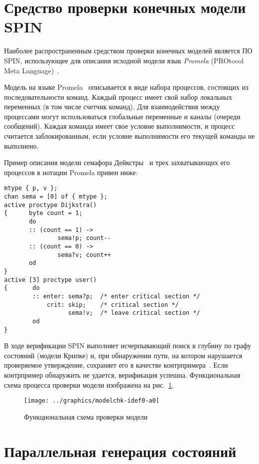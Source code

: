\documentclass[12pt,a4paper,fleqn]{article}
\begin{document}
\section{Средство проверки конечных модели SPIN}
\label{sec:spin}

Наиболее распространенным средством проверки конечных моделей является ПО SPIN, использующее для описания исходной
модели язык \emph{Promela} (PROtocol Meta Language)~\cite{SpinRoot}.

Модель на языке Promela~ описывается в виде набора процессов, состоящих из последовательности команд. Каждый процесс
имеет свой набор локальных переменных (в том числе счетчик команд). Для взаимодействия между процессами могут
использоваться глобальные переменные и каналы (очереди сообщений). Каждая команда имеет свое условие выполнимости, и
процесс считается заблокированным, если условие выполнимости его текущей команды не выполнено.

Пример описания модели семафора Дейкстры~\cite{SPIN} и трех захватывающих его процессов в нотации Promela привен ниже:

\begin{lstlisting}[language=Promela]
mtype { p, v };
chan sema = [0] of { mtype };
active proctype Dijkstra()
{      byte count = 1;
       do
       :: (count == 1) ->
               sema!p; count--
       :: (count == 0) ->
               sema?v; count++
       od
}
active [3] proctype user()
{       do
        :: enter: sema?p;  /* enter critical section */
            crit: skip;    /* critical section */
                  sema!v;  /* leave critical section */
        od
}  
\end{lstlisting}

В ходе верификации SPIN выполняет исчерпывающий поиск в глубину по графу состояний (модели Крипке) и, при обнаружении
пути, на котором нарушается проверяемое утверждение, сохраняет его в качестве контрпримера~\cite{Clarke}. Если
контрпример обнаружить не удается, верификация успешна. Функциональная схема процесса проверки модели изображена на
рис.~\ref{fig:modelchk-idef0-a0}.

\begin{figure}[ht]
  \centering
  \texttt{[image: ../graphics/modelchk-idef0-a0]}
  \caption{Функциональная схема проверки модели}
  \label{fig:modelchk-idef0-a0}
\end{figure}

\section{Параллельная генерация состояний}
\label{sec:pargen}
\end{document}
